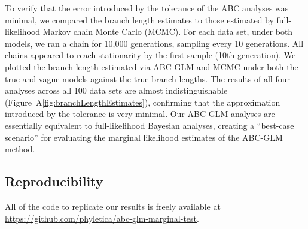 To verify that the error introduced by the tolerance of the ABC analyses was
minimal, we compared the branch length estimates to those estimated by
full-likelihood Markov chain Monte Carlo (MCMC).
For each data set, under both models, we ran a chain for 10,000 generations,
sampling every 10 generations.
All chains appeared to reach stationarity by the first sample (10th
generation).
We plotted the branch length estimated via ABC-GLM and MCMC under both
the true and vague models against the true branch lengths.
The results of all four analyses across all 100 data sets are almost
indistinguishable (Figure~A\ref{fig:branchLengthEstimates}), confirming that
the approximation introduced by the tolerance is very minimal.
Our ABC-GLM analyses are essentially equivalent to full-likelihood Bayesian
analyses, creating a ``best-case scenario'' for evaluating the marginal
likelihood estimates of the ABC-GLM method.


\subsection{Reproducibility}
All of the code to replicate our results is freely available at
\href{https://github.com/phyletica/abc-glm-marginal-test}{https://github.com/phyletica/abc-glm-marginal-test}.
